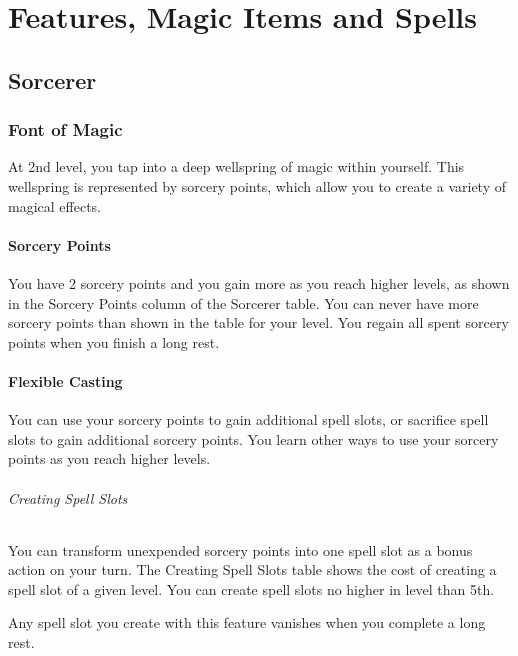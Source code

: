 \documentclass[letterpaper,openany,oneside,twocolumn]{book}
\begin{document}
\onecolumn


\rendercharactersheet

\renderbackgroundsheet

\renderspellsheet



\restoregeometry
\twocolumn

\chapter*{Features, Magic Items and Spells}

\section*{Sorcerer}
\subsection*{Font of Magic}
At 2nd level, you tap into a deep wellspring of magic within yourself. This wellspring is represented by sorcery points, which allow you to create a variety of magical effects.

\subsubsection*{Sorcery Points}
You have 2 sorcery points and you gain more as you reach higher levels, as shown in the Sorcery Points column of the Sorcerer table. You can never have more sorcery points than shown in the table for your level. You regain all spent sorcery points when you finish a long rest.

\subsubsection*{Flexible Casting}
You can use your sorcery points to gain additional spell slots, or sacrifice spell slots to gain additional sorcery points. You learn other ways to use your sorcery points as you reach higher levels.

\subparagraph*{Creating Spell Slots} You can transform unexpended sorcery points into one spell slot as a bonus action on your turn. The Creating Spell Slots table shows the cost of creating a spell slot of a given level. You can create spell slots no higher in level than 5th.

Any spell slot you create with this feature vanishes when you complete a long rest.
\end{document}
